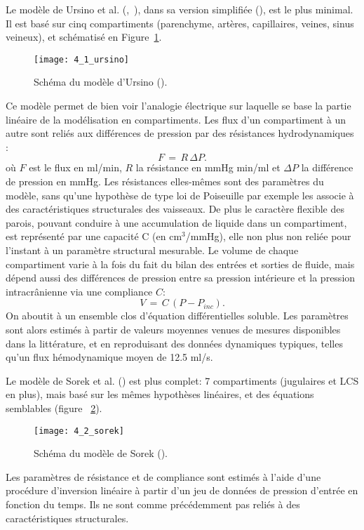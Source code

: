 Le modèle de Ursino et al. (\cite{Ursino1988},~\cite{Ursino1991}), dans sa version simplifiée (\cite{Ursino1997}), est le plus minimal. Il est
basé sur cinq compartiments (parenchyme, artères, capillaires, veines, sinus veineux), et schématisé
en Figure~\ref{fig:4_1_ursino}. 
\begin{figure}[!t]
\centering
\texttt{[image: 4\_1\_ursino]}
\caption{Schéma du modèle d'Ursino (\cite{Ursino1997}).}
\label{fig:4_1_ursino}	
\end{figure}
Ce modèle permet de bien voir l'analogie électrique sur laquelle se base la partie linéaire de la
modélisation en compartiments. Les flux d'un compartiment à un autre sont reliés aux différences de
pression par des résistances hydrodynamiques :
\begin{equation}
F\,=\,R\,\Delta P.
\end{equation}
où $F$ est le flux en ml/min, $R$ la résistance en mmHg min/ml et $\Delta P$ la différence de pression en mmHg.
Les résistances elles-mêmes sont des paramètres du modèle, sans qu'une hypothèse de type loi de Poiseuille
par exemple les associe à des caractéristiques structurales des vaisseaux. De plus le caractère flexible
des parois, pouvant conduire à une accumulation de liquide dans un compartiment, est représenté par
une capacité C (en cm$^3$/mmHg), elle non plus non reliée pour l'instant à un paramètre structural mesurable. Le volume
de chaque compartiment varie à la fois du fait du bilan des entrées et sorties de fluide, mais dépend
aussi des différences de pression entre sa pression intérieure et la pression intracrânienne via une compliance $C$:
\begin{equation}
V\,=\,C\,(P-P_{inc }).
\end{equation}
On aboutit à un ensemble clos d'équation différentielles soluble. Les paramètres sont alors estimés à
partir de valeurs moyennes venues de mesures disponibles dans la littérature, et en reproduisant des
données dynamiques typiques, telles qu'un flux hémodynamique moyen de 12.5 ml/s.

Le modèle de Sorek et al. (\cite{Sorek1988}) est plus complet: 7 compartiments (jugulaires et LCS en plus),
mais basé sur les mêmes hypothèses linéaires, et des équations semblables (figure ~\ref{fig:4_2_sorek}). 
\begin{figure}[!t]
\centering
\texttt{[image: 4\_2\_sorek]}
\caption{Schéma du modèle de Sorek (\cite{Sorek1988}).}
\label{fig:4_2_sorek}	
\end{figure}
Les paramètres de
résistance et de compliance sont estimés à l'aide d'une procédure d'inversion linéaire à partir d'un jeu
de données de pression d'entrée en fonction du temps. Ils ne sont comme précédemment pas reliés à
des caractéristiques structurales.

